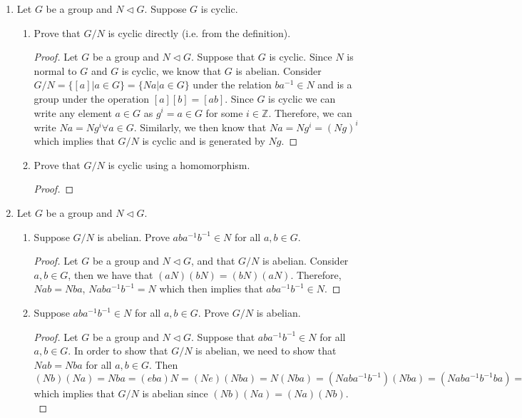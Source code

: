 \documentclass[11pt]{article}
\newcommand{\Z}{\mathbb{Z}}
\begin{document}
\begin{enumerate}

\item Let $G$ be a group and $N \triangleleft G$.  Suppose $G$ is cyclic.
\begin{enumerate}
\item Prove that $G/N$ is cyclic directly (i.e. from the definition).

\begin{proof}
Let $G$ be a group and $N \triangleleft G$. Suppose that $G$ is cyclic. Since $N$ is normal to $G$ and $G$ is cyclic, we know that $G$ is abelian. Consider $G/N = \{[a]|a\in G\}=\{Na|a\in G\}$ under the relation $ba^{-1}\in N$ and is a group under the operation $[a][b]=[ab]$. Since $G$ is cyclic we can write any element $a\in G$ as $g^i=a\in G$ for some $i\in \Z$. Therefore, we can write $Na = Ng^i \forall a\in G$. Similarly, we then know that $Na = Ng^i = (Ng)^i$ which implies that $G/N$ is cyclic and is generated by $Ng.$
\end{proof}

\item Prove that $G/N$ is cyclic using a homomorphism.

\begin{proof}

\end{proof}

\end{enumerate}
\pagebreak

\item Let $G$ be a group and $N \triangleleft G$. 
\begin{enumerate}
\item Suppose $G/N$ is abelian.  Prove $ab a^{-1} b^{-1} \in N$ for all $a,b \in G$.\\

\begin{proof}
Let $G$ be a group and $N \triangleleft G$, and that $G/N$ is abelian. Consider $a, b\in G$, then we have that $(aN)(bN) = (bN)(aN).$ Therefore, $Nab=Nba$, $Naba^{-1}b^{-1}=N$ which then implies that $aba^{-1}b^{-1}\in N.$
\end{proof}

\item Suppose $ab a^{-1} b^{-1} \in N$ for all $a,b \in G$.  Prove $G/N$ is abelian.\\

\begin{proof}
Let $G$ be a group and $N\triangleleft G$. Suppose that $aba^{-1}b^{-1}\in N$ for all $a, b\in G$. In order to show that $G/N$ is abelian, we need to show that $Nab=Nba$ for all $a,b\in G$. Then $(Nb)(Na)=Nba=(eba)N = (Ne)(Nba) = N(Nba) = (Naba^{-1}b^{-1})(Nba) = (Naba^{-1}b^{-1}ba) = Nab = (Na)(Nb)$ which implies that $G/N$ is abelian since $(Nb)(Na) = (Na)(Nb).$
\end{proof}


\end{enumerate}
\end{enumerate}
\end{document}
